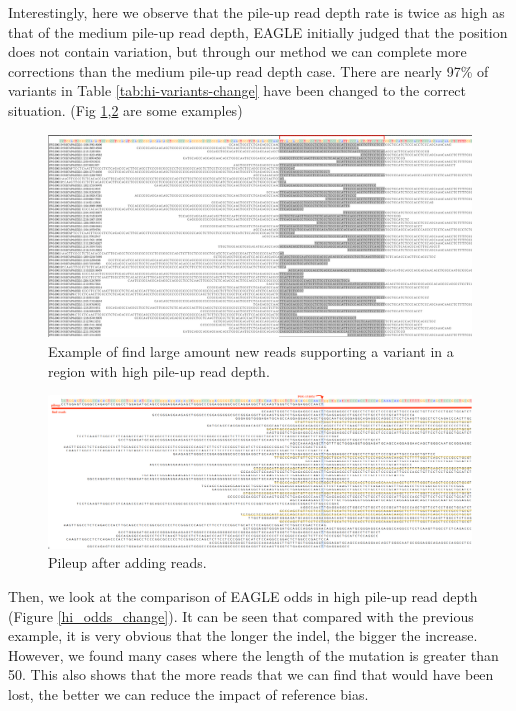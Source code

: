 Interestingly, here we observe that the pile-up read depth rate is twice as high as that of the medium pile-up read depth, EAGLE initially judged that the position does not contain variation, but through our method we can complete more corrections than the medium pile-up read depth case. There are nearly 97\% of variants in Table \ref{tab:hi-variants-change} have been changed to the correct situation. (Fig \ref{hi_new_REFread},\ref{hi_pileup_REFread} are some examples)

\begin{figure}[H]
\centering
\includegraphics[width=1\columnwidth]{body/image/hi_new_REFread.png}
\caption[New reads in a region with high pile-up read depth]{Example of find large amount new reads supporting a variant in a region with high pile-up read depth.}
\label{hi_new_REFread}
\end{figure}

\begin{figure}[H]
\centering
\includegraphics[width=1\columnwidth]{body/image/hi_pileup_REFread.png}
\caption[variant pileup in high pile-up read depth]{Pileup after adding reads.}
\label{hi_pileup_REFread}
\end{figure}

Then, we look at the comparison of EAGLE odds in high pile-up read depth (Figure \ref{hi_odds_change}). It can be seen that compared with the previous example, it is very obvious that the longer the indel, the bigger the increase. However, we found many cases where the length of the mutation is greater than 50. This also shows that the more reads that we can find that would have been lost, the better we can reduce the impact of reference bias.

